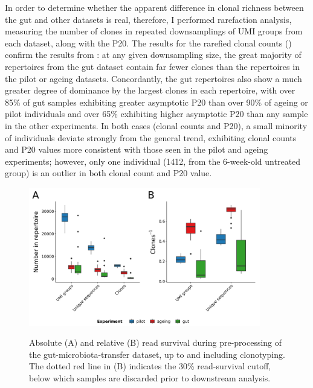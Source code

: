 In order to determine whether the apparent difference in clonal richness between the gut and other datasets is real, therefore, I performed rarefaction analysis, measuring the number of clones in repeated downsamplings of UMI groups from each dataset, along with the P20. %
The results for the rarefied clonal counts () confirm the results from : at any given downsampling size, the great majority of repertoires from the gut dataset contain far fewer clones than the repertoires in the pilot or ageing datasets. Concordantly, the gut repertoires also show a much greater degree of dominance by the largest clones in each repertoire, with over 85\% of gut samples exhibiting greater asymptotic P20 than over 90\% of ageing or pilot individuals and over 65\% exhibiting higher asymptotic P20 than any sample in the other experiments. In both cases (clonal counts and P20), a small minority of individuals deviate strongly from the general trend, exhibiting clonal counts and P20 values more consistent with those seen in the pilot and ageing experiments; however, only one individual (1412, from the 6-week-old untreated group) is an outlier in both clonal count and P20 value.

\begin{figure}
\centering
\includegraphics[width = 0.9\textwidth]{_Figures/png/igseq-comparative-metrics}
\begin{subfigure}{0em}
\label{fig:igseq-comparative-metrics-abs}
\end{subfigure}
\begin{subfigure}{0em}
\label{fig:igseq-comparative-metrics-rel}
\end{subfigure}
\caption{Absolute (A) and relative (B) read survival during pre-processing of the \igseq gut-microbiota-transfer dataset, up to and including clonotyping. The dotted red line in (B) indicates the 30\% read-survival cutoff, below which samples are discarded prior to downstream analysis.}
\label{fig:igseq-comparative-metrics}
\end{figure}

